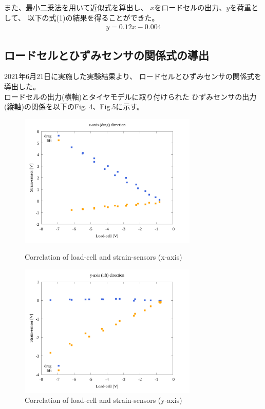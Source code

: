 \documentclass[twocolumn,a4j]{jsarticle}
\begin{document}
また、最小二乗法を用いて近似式を算出し、
$x$をロードセルの出力、$y$を荷重として、
以下の式(1)の結果を得ることができた。
\begin{eqnarray}
    y = 0.12 x - 0.004
\end{eqnarray}

\subsection{ロードセルとひずみセンサの関係式の導出}
2021年6月21日に実施した実験結果より、
ロードセルとひずみセンサの関係式を導出した。\\
ロードセルの出力(横軸)とタイヤモデルに取り付けられた
ひずみセンサの出力(縦軸)の関係を以下のFig. 4、Fig.5に示す。
\begin{figure}[htbp]
    \footnotesize
    \begin{center}
        \includegraphics[width=85mm]{../images/05_strainsensor-loadcell_x.png}
        \caption{Correlation of load-cell and strain-sensors (x-axis)}
        \includegraphics[width=85mm]{../images/06_strainsensor-loadcell_y.png}
        \caption{Correlation of load-cell and strain-sensors (y-axis)}
    \end{center}
\end{figure}

\newpage
\end{document}

